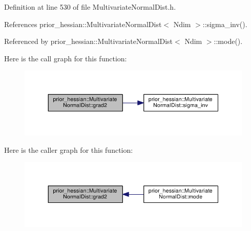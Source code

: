 Definition at line 530 of file Multivariate\+Normal\+Dist.\+h.



References prior\+\_\+hessian\+::\+Multivariate\+Normal\+Dist$<$ Ndim $>$\+::sigma\+\_\+inv().



Referenced by prior\+\_\+hessian\+::\+Multivariate\+Normal\+Dist$<$ Ndim $>$\+::mode().



Here is the call graph for this function\+:\nopagebreak
\begin{figure}[H]
\begin{center}
\leavevmode
\includegraphics[width=350pt]{classprior__hessian_1_1MultivariateNormalDist_abddd70ca592cc71d9269f227ef53f90a_cgraph}
\end{center}
\end{figure}




Here is the caller graph for this function\+:\nopagebreak
\begin{figure}[H]
\begin{center}
\leavevmode
\includegraphics[width=350pt]{classprior__hessian_1_1MultivariateNormalDist_abddd70ca592cc71d9269f227ef53f90a_icgraph}
\end{center}
\end{figure}


